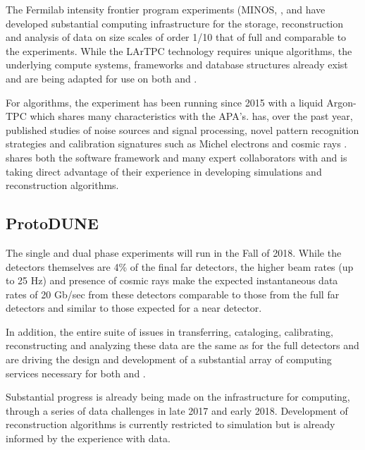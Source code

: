 The Fermilab intensity frontier program experiments (MINOS\cite{minos},  \cite{minerva}, \cite{microboone} and  \cite{nova} have developed substantial computing infrastructure for the storage, reconstruction and analysis of data on size scales of order 1/10 that of full   and comparable to the  experiments. While the LArTPC technology requires unique algorithms, the underlying compute systems, frameworks and database structures already exist and are being adapted for use on both  and  .

For algorithms, the  \cite{Acciarri:2016smi} experiment has been running since 2015 with a liquid Argon-TPC which shares many characteristics with the   APA's.     has, over the past year, published studies of noise sources and signal processing\cite{Acciarri:2017sde,Adams:2018dra}, novel pattern recognition strategies \cite{Acciarri:2016ryt,Acciarri:2017hat} and calibration signatures such as Michel electrons and cosmic rays \cite{Acciarri:2017sjy,Acciarri:2017sde}.    shares both the \larsoft software framework and many expert collaborators with   and is taking direct advantage of their experience in developing simulations and reconstruction algorithms.


\subsection{ProtoDUNE}\label{sw:PD-planning}

The  single and dual phase experiments will run in the Fall of 2018.  While the detectors themselves are 4\% of the final far detectors, the higher beam rates (up to 25 Hz) and presence of cosmic rays make the expected instantaneous data rates of 20 Gb/sec from these detectors comparable to those from the full far detectors and similar to those expected for a near detector. 

In addition, the entire suite of issues in transferring, cataloging, calibrating, reconstructing and analyzing these data are the same as for the full detectors and are driving the design and development of a substantial array of computing services necessary for both  and  .

Substantial progress is already being made on the infrastructure for computing, through a series of data challenges in late 2017 and early 2018. Development of reconstruction algorithms is currently restricted to simulation but is already informed by the experience with   data.


